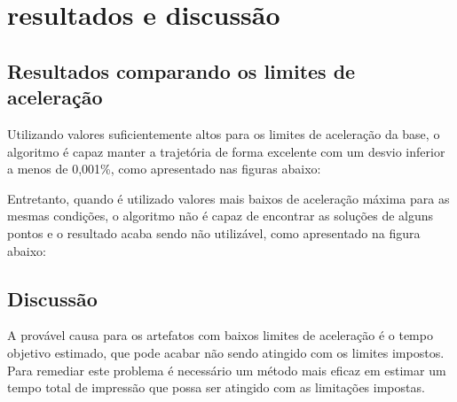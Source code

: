 \chapter{resultados e discussão}

\section{Resultados comparando os limites de aceleração}
Utilizando valores suficientemente altos para os limites de 
aceleração da base, o algoritmo é capaz manter a trajetória 
de forma excelente com um desvio inferior a menos de 0,001\%, 
como apresentado nas figuras abaixo:

Entretanto, quando é utilizado valores mais baixos de aceleração 
máxima para as mesmas condições, o algoritmo não é capaz de 
encontrar as soluções de alguns pontos e o resultado acaba 
sendo não utilizável, como apresentado na figura abaixo:

\section{Discussão}
A provável causa para os artefatos com baixos limites de 
aceleração é o tempo objetivo estimado, que pode acabar não 
sendo atingido com os limites impostos. Para remediar este 
problema é necessário um método mais eficaz em estimar um 
tempo total de impressão que possa ser atingido com as 
limitações impostas.









